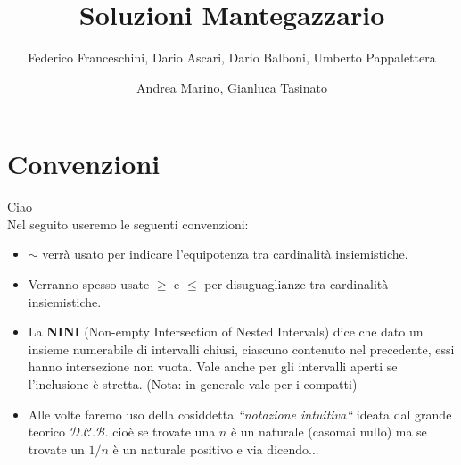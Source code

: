 \documentclass[a4paper,11pt]{article}
\title{Soluzioni Mantegazzario}
\author{Federico Franceschini, Dario Ascari, Dario Balboni, Umberto Pappalettera}
\author{Andrea Marino, Gianluca Tasinato}
\newcommand{\equip}{\sim}
\newcommand{\NINI}{{\bf NINI }}
\begin{document}
\maketitle

\section*{Convenzioni}
Ciao \\
Nel seguito useremo le seguenti convenzioni: \\
\begin{itemize}
\item $\equip$ verr\`a usato per indicare l'equipotenza tra cardinalit\`a insiemistiche.
\item Verranno spesso usate $\ge$ e $\le$ per disuguaglianze tra cardinalit\`a insiemistiche.
\item La \NINI (Non-empty Intersection of Nested Intervals) dice che dato un insieme numerabile di intervalli chiusi, ciascuno contenuto nel precedente, essi hanno intersezione non vuota. Vale anche per gli intervalli aperti se l'inclusione \`e stretta. (Nota: in generale vale per i compatti)
\item Alle volte faremo uso della cosiddetta {\it ``notazione intuitiva``} ideata dal grande teorico $\mathcal{D}$.$\mathcal{C}$.$\mathcal{B}$. cioè se trovate una $n$ è un naturale (casomai nullo) ma se trovate un $1/n$ è un naturale positivo e via dicendo... 
\end{itemize}
\end{document}
